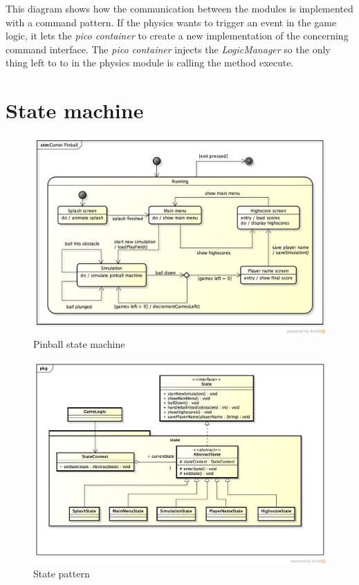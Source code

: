 \documentclass[fontsize=12pt,
               paper=a4,
               twoside=false,
               parskip=half,
               ]{scrartcl}
\begin{document}
This diagram shows how the communication between the modules is implemented with a command pattern. If the physics wants to trigger an event in the game logic, it lets the \emph{pico container} to create a new implementation of the concerning command interface. The \emph{pico container} injects the \emph{LogicManager} so the only thing left to to in the physics module is calling the method execute.


\section{State machine}

\begin{figure}[h!]
	\centering
	\includegraphics[width=15.5cm]{./img/state-machine.png}
	\caption[Pinball state machine]{Pinball state machine}
	\label{fig:command_pattern}
\end{figure}


\begin{figure}[h!]
	\centering
	\includegraphics[width=15.5cm]{./img/state-pattern.png}
	\caption[State pattern]{State pattern}
	\label{fig:state_pattern}
\end{figure}
\end{document}
